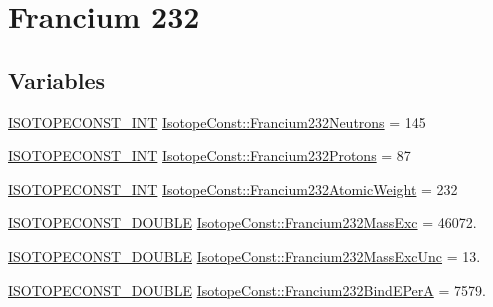 \hypertarget{group___isotope_const-_francium-_fr232}{}\section{Francium 232}
\label{group___isotope_const-_francium-_fr232}
\subsection*{Variables}
\begin{DoxyCompactItemize}
\item 
\mbox{\hyperlink{group___isotope_const-_macros_ga5f18360b3e99483a35c32d789e62621c}{I\+S\+O\+T\+O\+P\+E\+C\+O\+N\+S\+T\+\_\+\+I\+NT}} \mbox{\hyperlink{group___isotope_const-_francium-_fr232_ga24ae9bba60b9c221a466b3a3bfd146f1}{Isotope\+Const\+::\+Francium232\+Neutrons}} = 145
\item 
\mbox{\hyperlink{group___isotope_const-_macros_ga5f18360b3e99483a35c32d789e62621c}{I\+S\+O\+T\+O\+P\+E\+C\+O\+N\+S\+T\+\_\+\+I\+NT}} \mbox{\hyperlink{group___isotope_const-_francium-_fr232_ga80684012e86db61daff6a030ef3f2ecd}{Isotope\+Const\+::\+Francium232\+Protons}} = 87
\item 
\mbox{\hyperlink{group___isotope_const-_macros_ga5f18360b3e99483a35c32d789e62621c}{I\+S\+O\+T\+O\+P\+E\+C\+O\+N\+S\+T\+\_\+\+I\+NT}} \mbox{\hyperlink{group___isotope_const-_francium-_fr232_ga077cf8f504b7ef36e258f7067a1f12e3}{Isotope\+Const\+::\+Francium232\+Atomic\+Weight}} = 232
\item 
\mbox{\hyperlink{group___isotope_const-_macros_ga8f45a7272ce02c0b4c65c44636ed719a}{I\+S\+O\+T\+O\+P\+E\+C\+O\+N\+S\+T\+\_\+\+D\+O\+U\+B\+LE}} \mbox{\hyperlink{group___isotope_const-_francium-_fr232_ga86f51945091aab85468de57c52bbda2c}{Isotope\+Const\+::\+Francium232\+Mass\+Exc}} = 46072.
\item 
\mbox{\hyperlink{group___isotope_const-_macros_ga8f45a7272ce02c0b4c65c44636ed719a}{I\+S\+O\+T\+O\+P\+E\+C\+O\+N\+S\+T\+\_\+\+D\+O\+U\+B\+LE}} \mbox{\hyperlink{group___isotope_const-_francium-_fr232_ga839f2770bee791935e0b9d9c3b4359cd}{Isotope\+Const\+::\+Francium232\+Mass\+Exc\+Unc}} = 13.
\item 
\mbox{\hyperlink{group___isotope_const-_macros_ga8f45a7272ce02c0b4c65c44636ed719a}{I\+S\+O\+T\+O\+P\+E\+C\+O\+N\+S\+T\+\_\+\+D\+O\+U\+B\+LE}} \mbox{\hyperlink{group___isotope_const-_francium-_fr232_ga75e8dca4adc741fee34f79203ad5a585}{Isotope\+Const\+::\+Francium232\+Bind\+E\+PerA}} = 7579.
\item 

\end{DoxyCompactItemize}
